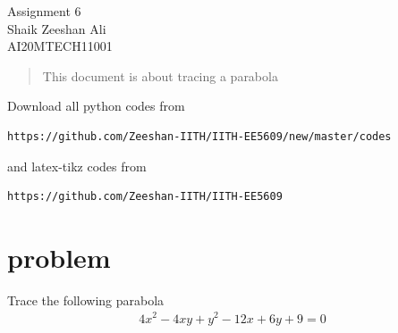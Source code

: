 \documentclass[journal,12pt,twocolumn]{IEEEtran}
\numberwithin{equation}{subsection}
\begin{document}
\begin{center}
\huge Assignment 6\\

\large Shaik Zeeshan Ali\\
\large AI20MTECH11001\\
\end{center}
\begin{abstract}
This document is about tracing a parabola
\end{abstract}
Download all python codes from 
\begin{lstlisting}
https://github.com/Zeeshan-IITH/IITH-EE5609/new/master/codes
\end{lstlisting}

and latex-tikz codes from 
\begin{lstlisting}
https://github.com/Zeeshan-IITH/IITH-EE5609
\end{lstlisting}
\section{problem}
Trace the following parabola
\begin{align}
    4x^2-4xy+y^2-12x+6y+9=0
\end{align}
\end{document}

